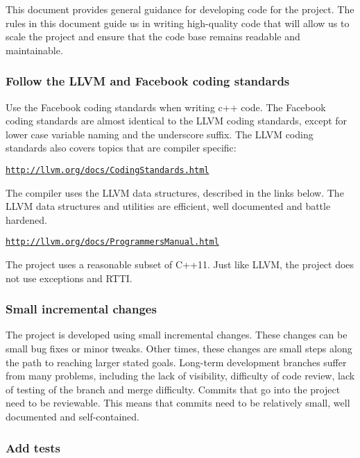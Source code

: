 This document provides general guidance for developing code for the project. The rules in this document guide us in writing high-\/quality code that will allow us to scale the project and ensure that the code base remains readable and maintainable.

\subsubsection*{Follow the L\+L\+VM and Facebook coding standards}

Use the Facebook coding standards when writing c++ code. The Facebook coding standards are almost identical to the L\+L\+VM coding standards, except for lower case variable naming and the underscore suffix. The L\+L\+VM coding standards also covers topics that are compiler specific\+:

\textquotesingle{}\textquotesingle{}\textquotesingle{} \href{http://llvm.org/docs/CodingStandards.html}{\tt http\+://llvm.\+org/docs/\+Coding\+Standards.\+html} \textquotesingle{}\textquotesingle{}\textquotesingle{}

The compiler uses the L\+L\+VM data structures, described in the links below. The L\+L\+VM data structures and utilities are efficient, well documented and battle hardened.

\textquotesingle{}\textquotesingle{}\textquotesingle{} \href{http://llvm.org/docs/ProgrammersManual.html}{\tt http\+://llvm.\+org/docs/\+Programmers\+Manual.\+html} \textquotesingle{}\textquotesingle{}\textquotesingle{}

The project uses a reasonable subset of C++11. Just like L\+L\+VM, the project does not use exceptions and R\+T\+TI.

\subsubsection*{Small incremental changes}

The project is developed using small incremental changes. These changes can be small bug fixes or minor tweaks. Other times, these changes are small steps along the path to reaching larger stated goals. Long-\/term development branches suffer from many problems, including the lack of visibility, difficulty of code review, lack of testing of the branch and merge difficulty. Commits that go into the project need to be reviewable. This means that commits need to be relatively small, well documented and self-\/contained.

\subsubsection*{Add tests}

